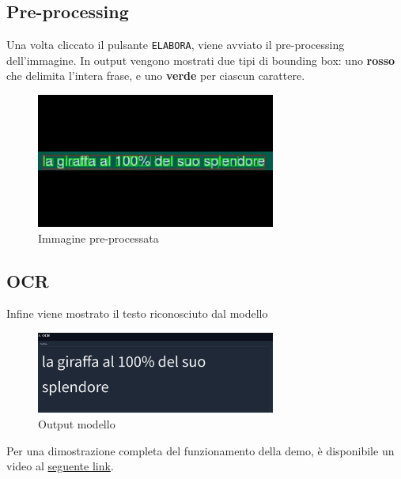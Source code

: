 \subsection*{Pre-processing}
Una volta cliccato il pulsante \texttt{ELABORA}, viene avviato il pre-processing dell'immagine. In output vengono mostrati due tipi di bounding box: uno \textbf{rosso} che delimita l'intera frase, e uno \textbf{verde} per ciascun carattere.

\begin{figure}[H]
    \centering
    \includegraphics[width=0.7\textwidth]{images/demo-2fasedetail.png}
    \caption{Immagine pre-processata}
    \label{fig:demo-2fase}
\end{figure}

\subsection*{OCR}
Infine viene mostrato il testo riconosciuto dal modello
\begin{figure}[H]
    \centering
    \includegraphics[width=0.7\textwidth]{images/demo-3fase.png}
    \caption{Output modello}
    \label{fig:demo-3fase}
\end{figure}

Per una dimostrazione completa del funzionamento della demo, è disponibile un video al \href{https://github.com/user-attachments/assets/c438a7b3-e5fd-433e-a72f-7376223e9067}{seguente link}.